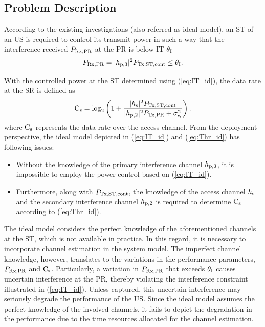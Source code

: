 \subsection{Problem Description} \label{ssec:pd}
According to the existing investigations (also referred as ideal model), an ST of an US is required to control its transmit power in such a way that the interference received $P_{\text{Rx,PR}}$ at the PR is below IT $\theta_{\text{I}}$ \cite{Xing07}
\begin{equation}
P_{\text{Rx,PR}} = |h_{\text{p,3}}|^2 P_{\text{Tx,ST,cont}} \le \theta_{\text{I}}.
\label{eq:IT_id}
\end{equation}

With the controlled power at the ST determined using (\ref{eq:IT_id}), the data rate at the SR is defined as
\begin{equation}
\text{C}_{\text{s}} = \log_2 \left(1 + \frac{|h_{\text{s}}|^2 P_{\text{Tx,ST,cont}}}{ |h_{\text{p,2}}|^2 P_{\text{Tx,PR}} + \sigma^2_{\text{w}}} \right). 
\label{eq:Thr_id}
\end{equation}
where $\text{C}_{\text{s}}$ represents the data rate over the access channel. %
From the deployment perspective, the ideal model depicted in (\ref{eq:IT_id}) and (\ref{eq:Thr_id}) has following issues:
\begin{itemize}
\item Without the knowledge of the primary interference channel $h_{\text{p,3}}$, it is impossible to employ the power control based on (\ref{eq:IT_id}). 
\item Furthermore, along with $P_{\text{Tx,ST,cont}}$, the knowledge of the access channel $h_{\text{s}}$ and the secondary interference channel $h_{\text{p,2}}$ is required to determine $\text{C}_{\text{s}}$ according to (\ref{eq:Thr_id}).
\end{itemize}
The ideal model considers the perfect knowledge of the aforementioned channels at the ST, which is not available in practice. In this regard, it is necessary to incorporate channel estimation in the system model. The imperfect channel knowledge, however, translates to the variations in the performance parameters, $P_{\text{Rx,PR}}$ and $\text{C}_{\text{s}}$. Particularly, a variation in $P_{\text{Rx,PR}}$ that exceeds $\theta_{\text{I}}$ causes uncertain interference at the PR, thereby violating the interference constraint illustrated in (\ref{eq:IT_id}). Unless captured, this uncertain interference may seriously degrade the performance of the US. Since the ideal model assumes the perfect knowledge of the involved channels, it fails to depict the degradation in the performance due to the time resources allocated for the channel estimation. %

